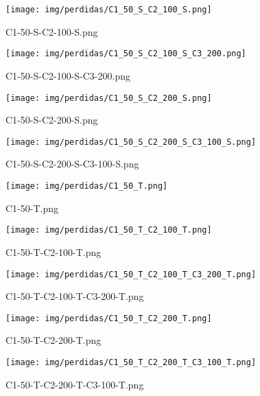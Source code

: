 \begin{figure}[H]
    \centerline{\texttt{[image: img/perdidas/C1\_50\_S\_C2\_100\_S.png]}}
    \caption{C1-50-S-C2-100-S.png}
    \label{fig:C1_50_S_C2_100_S.png}
\end{figure}

\begin{figure}[H]
    \centerline{\texttt{[image: img/perdidas/C1\_50\_S\_C2\_100\_S\_C3\_200.png]}}
    \caption{C1-50-S-C2-100-S-C3-200.png}
    \label{fig:C1_50_S_C2_100_S_C3_200.png}
\end{figure}

\begin{figure}[H]
    \centerline{\texttt{[image: img/perdidas/C1\_50\_S\_C2\_200\_S.png]}}
    \caption{C1-50-S-C2-200-S.png}
    \label{fig:C1_50_S_C2_200_S.png}
\end{figure}

\begin{figure}[H]
    \centerline{\texttt{[image: img/perdidas/C1\_50\_S\_C2\_200\_S\_C3\_100\_S.png]}}
    \caption{C1-50-S-C2-200-S-C3-100-S.png}
    \label{fig:C1_50_S_C2_200_S_C3_100_S.png}
\end{figure}

\begin{figure}[H]
    \centerline{\texttt{[image: img/perdidas/C1\_50\_T.png]}}
    \caption{C1-50-T.png}
    \label{fig:C1_50_T.png}
\end{figure}

\begin{figure}[H]
    \centerline{\texttt{[image: img/perdidas/C1\_50\_T\_C2\_100\_T.png]}}
    \caption{C1-50-T-C2-100-T.png}
    \label{fig:C1_50_T_C2_100_T.png}
\end{figure}

\begin{figure}[H]
    \centerline{\texttt{[image: img/perdidas/C1\_50\_T\_C2\_100\_T\_C3\_200\_T.png]}}
    \caption{C1-50-T-C2-100-T-C3-200-T.png}
    \label{fig:C1_50_T_C2_100_T_C3_200_T.png}
\end{figure}

\begin{figure}[H]
    \centerline{\texttt{[image: img/perdidas/C1\_50\_T\_C2\_200\_T.png]}}
    \caption{C1-50-T-C2-200-T.png}
    \label{fig:C1_50_T_C2_200_T.png}
\end{figure}

\begin{figure}[H]
    \centerline{\texttt{[image: img/perdidas/C1\_50\_T\_C2\_200\_T\_C3\_100\_T.png]}}
    \caption{C1-50-T-C2-200-T-C3-100-T.png}
    \label{fig:C1_50_T_C2_200_T_C3_100_T.png}
\end{figure}

